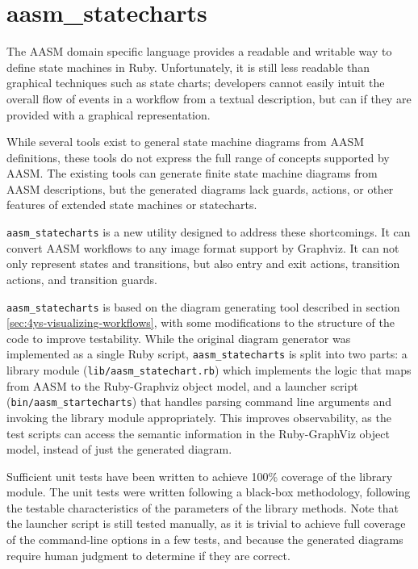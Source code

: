 \documentclass[document.tex]{subfiles}
\begin{document}
\FloatBarrier


\section {aasm\_statecharts}

The AASM domain specific language provides a readable and writable way to define state machines in Ruby. Unfortunately, it is still less readable than graphical techniques such as state charts; developers cannot easily intuit the overall flow of events in a workflow from a textual description, but can if they are provided with a graphical representation.

While several tools exist to general state machine diagrams from AASM definitions, these tools do not express the full range of concepts supported by AASM. The existing tools can generate finite state machine diagrams from AASM descriptions, but the generated diagrams lack guards, actions, or other features of extended state machines or statecharts.

\verb!aasm_statecharts! \cite{aasm_statecharts} is a new utility designed to address these shortcomings. It can convert AASM workflows to any image format support by Graphviz. It can not only represent states and transitions, but also entry and exit actions, transition actions, and transition guards.

\verb!aasm_statecharts! is based on the diagram generating tool described in section \ref{sec:4ys-visualizing-workflows}, with some modifications to the structure of the code to improve testability. While the original diagram generator was implemented as a single Ruby script, \verb!aasm_statecharts! is split into two parts: a library module (\verb!lib/aasm_statechart.rb!) which implements the logic that maps from AASM to the Ruby-Graphviz object model, and a launcher script (\verb!bin/aasm_startecharts!) that handles parsing command line arguments and invoking the library module appropriately. This improves observability, as the test scripts can access the semantic information in the Ruby-GraphViz object model, instead of just the generated diagram.

Sufficient unit tests have been written to achieve 100\% coverage of the library module. The unit tests were written following a black-box methodology, following the testable characteristics of the parameters of the library methods.
Note that the launcher script is still tested manually, as it is trivial to achieve full coverage of the command-line options in a few tests, and because the generated diagrams require human judgment to determine if they are correct.
\end{document}
